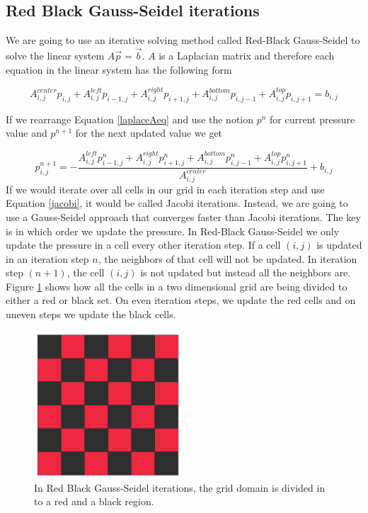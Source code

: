 \subsection{Red Black Gauss-Seidel iterations}

We are going to use an iterative solving method called Red-Black Gauss-Seidel to solve the linear system $A\vec{p} = \vec{b}$. $A$ is a Laplacian matrix and therefore each equation in the linear system has the following form

\begin{equation}
{A}^{center}_{i,j} p_{i,j} + {A}^{left}_{i,j} p_{i-1,j} + {A}^{right}_{i,j} p_{i+1,j} + {A}^{bottom}_{i,j} p_{i,j-1} + {A}^{top}_{i,j} p_{i,j+1} = b_{i,j}
\label{laplaceAeq}
\end{equation}

If we rearrange Equation \ref{laplaceAeq} and use the notion $p^n$ for current pressure value and $p^{n+1}$ for the next updated value we get

\begin{equation}
{p}^{n+1}_{i,j}  = -\frac{ {A}^{left}_{i,j} {p}^{n}_{i-1,j} + {A}^{right}_{i,j} {p}^{n}_{i+1,j} + {A}^{bottom}_{i,j} {p}^{n}_{i,j-1} + {A}^{top}_{i,j} {p}^{n}_{i,j+1}}{{A}^{center}_{i,j}} + b_{i,j}
\label{jacobi}
\end{equation}
\newline
\noindent
If we would iterate over all cells in our grid in each iteration step and use Equation \ref{jacobi}, it would be called Jacobi iterations. Instead, we are going to use a Gauss-Seidel approach that converges faster than Jacobi iterations. The key is in which order we update the pressure. In Red-Black Gauss-Seidel we only update the pressure in a cell every other iteration step. If a cell $(i,j)$ is updated in an iteration step $n$, the neighbors of that cell will not be updated. In iteration step $(n+1)$, the cell $(i,j)$ is not updated but instead all the neighbors are. Figure \ref{redblack} shows how all the cells in a two dimensional grid are being divided to either a red or black set. On even iteration steps, we update the red cells and on uneven steps we update the black cells.

\begin{figure}[ht!]
\centering
\includegraphics[width=55mm]{img/redblack.pdf}
\caption{In Red Black Gauss-Seidel iterations, the grid domain is divided in to a red and a black region. }
\label{redblack}
\end{figure}
